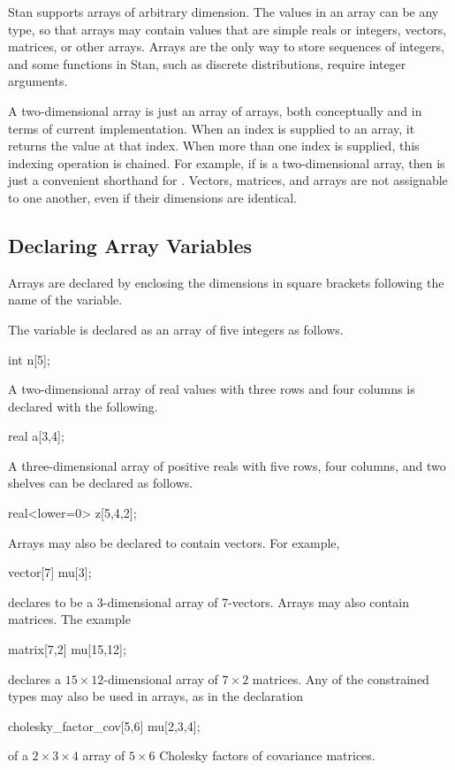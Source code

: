 Stan supports arrays of arbitrary dimension.  The values in an array
can be any type, so that arrays may contain values that are simple
reals or integers, vectors, matrices, or other arrays.  Arrays are the
only way to store sequences of integers, and some functions in Stan,
such as discrete distributions, require integer arguments.

A two-dimensional array is just an array of arrays, both conceptually
and in terms of current implementation.  When an index is supplied to
an array, it returns the value at that index.  When more than one
index is supplied, this indexing operation is chained.  For example, if
 is a two-dimensional array, then  is just
a convenient shorthand for .
%
Vectors, matrices, and arrays are not assignable to one another, even
if their dimensions are identical.

\subsection{Declaring Array Variables}

Arrays are declared by enclosing the dimensions in square brackets
following the name of the variable.

The variable  is declared as an array of five integers as follows.
%
\begin{stancode}
int n[5];
\end{stancode}
%
A two-dimensional array of real values with three rows and four columns is
declared with the following.
%
\begin{stancode}
real a[3,4];
\end{stancode}
%
A three-dimensional array  of positive reals with five rows, four
columns, and two shelves can be declared as follows.
%
\begin{stancode}
real<lower=0> z[5,4,2];
\end{stancode}
%

Arrays may also be declared to contain vectors.  For example,
%
\begin{stancode}
vector[7] mu[3];
\end{stancode}
%
declares  to be a 3-dimensional array of 7-vectors.
Arrays may also contain matrices.  The example
%
\begin{stancode}
matrix[7,2] mu[15,12];
\end{stancode}
%
declares a $15 \times 12$-dimensional array of $7 \times 2$ matrices.
Any of the constrained types may also be used in arrays, as in the
declaration
%
\begin{stancode}
cholesky_factor_cov[5,6] mu[2,3,4];
\end{stancode}
%
of a $2 \times 3 \times 4$ array of $5 \times 6$ Cholesky factors of
covariance matrices.

